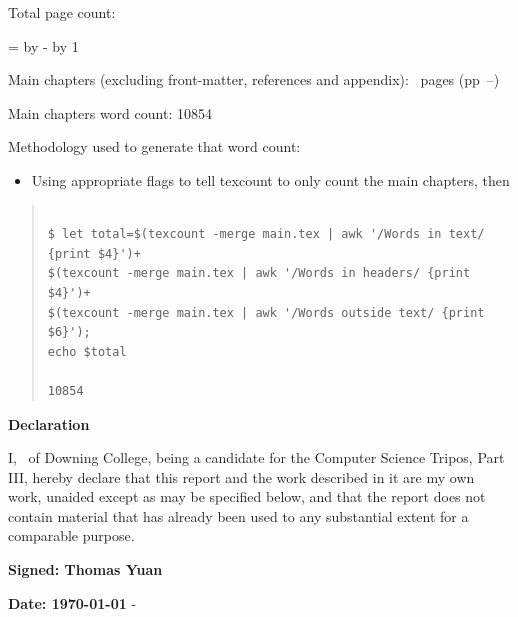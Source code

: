 \documentclass[12pt,a4paper,twoside]{report}
\newif\ifsubmission %
\newcommand{\college}{Downing College}
\newcommand{\course}{Computer Science Tripos, Part III}
\begin{document}
\begin{sffamily}
\newpage

Total page count: \pageref{lastpage}

\makeatletter
\@tempcnta=\relax%
\advance\@tempcnta by -%
\advance\@tempcnta by 1%
\xdef\contentpages{\the\@tempcnta}%
\makeatother

Main chapters (excluding front-matter, references and appendix):
\contentpages~pages
(pp~\pageref{firstcontentpage}--\pageref{lastcontentpage})

Main chapters word count: 10854

Methodology used to generate that word count:

\begin{itemize}
  \item Using appropriate flags to tell texcount to only count the main chapters, then
\end{itemize}

\begin{quote}
\begin{verbatim}

$ let total=$(texcount -merge main.tex | awk '/Words in text/ {print $4}')+
$(texcount -merge main.tex | awk '/Words in headers/ {print $4}')+
$(texcount -merge main.tex | awk '/Words outside text/ {print $6}');
echo $total

10854
\end{verbatim}
\end{quote}


\end{sffamily}

\vspace{\fill}
\onehalfspacing
\ifsubmission\else\makeatletter
\textbf{\Huge Declaration}
\vspace{40pt}

I, \@author\ of \college, being a candidate for the \course, hereby
declare that this report and the work described in it are my own work,
unaided except as may be specified below, and that the report does not
contain material that has already been used to any substantial extent
for a comparable purpose.


\bigskip 
\textbf{Signed: Thomas Yuan}

\bigskip
\textbf{Date: \today}
\vspace{\fill}
\makeatother\fi-
\end{document}

